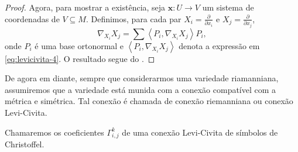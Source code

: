 \begin{theorem}
\begin{proof}
		Agora, para mostrar a existência, seja $\mathbf{x}:U\to V$ um sistema de coordenadas de $V \subseteq M$. Definimos, para cada par $X_{i}=\frac{\partial}{\partial x_{i}}$ e $X_{j}=\frac{\partial}{\partial x_{j}}$,
		\begin{equation*}
			\nabla_{X_{i}}X_{j} = \sum \left<P_{i},\nabla_{X_{i}}X_{j}\right> P_{i},
		\end{equation*}
		onde $P_{i}$ é uma base ortonormal e $\left<P_{i},\nabla_{X_{i}}X_{j}\right>$ denota a expressão em \eqref{eq:levicivita-4}. O resultado segue do .
	\end{proof}
\end{theorem}
De agora em diante, sempre que considerarmos uma variedade riamanniana, assumiremos que a variedade está munida com a conexão compatível com a métrica e simétrica. Tal conexão é chamada de conexão riemanniana ou conexão Levi-Civita.

Chamaremos os coeficientes $\Gamma_{i,j}^{k}$ de uma conexão Levi-Civita de símbolos de Christoffel.

